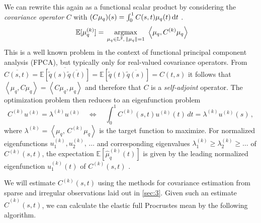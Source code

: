 We can rewrite this again as a functional scalar product by considering the \emph{covariance operator} $C$ with $(C\mu_q)(s) = \int_0^1 C(s,t) \mu_q(t) \mathop{\mathrm{d}t}$ \parencite[see][153]{RamsaySilverman2005}.
\begin{equation}\
  \label{eq:quadr_opt}
  \mathbb{E}[\mu_q^{(k)}] = \, \operatorname*{argmax}_{\mu_q \in \mathbb{L}^2,\,\lVert\mu_q\rVert = 1}\,\,
    \left\langle \mu_q, C^{(k)}\mu_q \right\rangle
\end{equation}
This is a well known problem in the context of functional principal component analysis (FPCA), but typically only for real-valued covariance operators.
From $\overline{C(s,t)} = \overline{\mathbb{E}[\widetilde q(s)\overline{\widetilde q(t)}]} = \mathbb{E}[\widetilde q(t)\overline{\widetilde q(s)}] = C(t,s)$ it follows that $\left\langle \mu_q, C \mu_q \right\rangle = \left\langle C \mu_q, \mu_q \right\rangle$ and therefore that $C$ is a \emph{self-adjoint} operator.
The optimization problem then reduces to an eigenfunction problem 
\begin{equation}
  \label{eq:funceig}
  C^{(k)} u^{(k)} = \lambda^{(k)} u^{(k)} \quad \Leftrightarrow \quad \int_0^1 C^{(k)}(s, t) u^{(k)}(t)\, dt = \lambda^{(k)} u^{(k)}(s)\,,
\end{equation}
where $\lambda^{(k)} = \left\langle \mu_q,\, C^{(k)} \mu_q \right\rangle$ is the target function to maximize.
For normalized eigenfunctions $u^{(k)}_1, u^{(k)}_2,\,\dots$ and corresponding eigenvalues $\lambda^{(k)}_1 \geq \lambda^{(k)}_2 \geq \dots$ of $C^{(k)}(s,t)$, the expectation $\mathbb{E}[\hat\mu_q^{(k)}(t)]$ is given by the leading normalized eigenfunction $u^{(k)}_1(t)$ of $C^{(k)}(s,t)$ \parencite[see][153,397]{RamsaySilverman2005}.

We will estimate $C^{(k)}(s,t)$ using the methods for covariance estimation from sparse and irregular observations laid out in \cref{sec:3}.
Given such an estimate $\hat C^{(k)}(s,t)$, we can calculate the elastic full Procrustes mean by the following algorithm.

